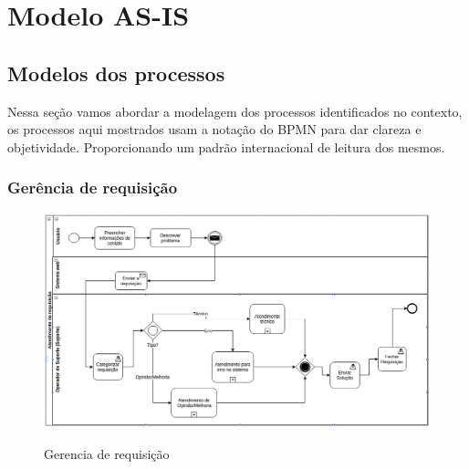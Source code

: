 \section{Modelo AS-IS}

\subsection{Modelos dos processos}
Nessa seção vamos abordar a modelagem dos processos identificados no contexto,
os processos aqui mostrados usam a notação do BPMN para dar clareza e objetividade.
Proporcionando um padrão internacional de leitura dos mesmos.

\subsubsection{Gerência de requisição}
\begin{figure}[!h]
\caption{Gerencia de requisição}
\centering %
\includegraphics[width=15cm]{as-is/01_atendimento_de_requisicao.png}
\label{figura:atendimento_requisicao_as_is}
\end{figure}

